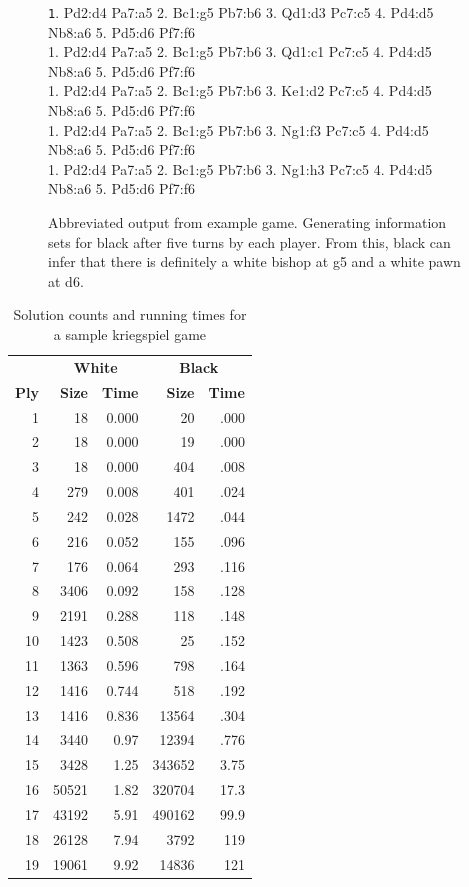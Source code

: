 \documentclass[11pt]{article}
\newenvironment{mytinylisting}
{\begin{list}{}{\setlength{\leftmargin}{1em}}\item\scriptsize\texttt}
{\end{list}}
\begin{document}
\begin{figure}
\begin{mytinylisting}
1. Pd2:d4 Pa7:a5 2. Bc1:g5 Pb7:b6 3. Qd1:d3 Pc7:c5 4. Pd4:d5 Nb8:a6 5. Pd5:d6 Pf7:f6 \\
1. Pd2:d4 Pa7:a5 2. Bc1:g5 Pb7:b6 3. Qd1:c1 Pc7:c5 4. Pd4:d5 Nb8:a6 5. Pd5:d6 Pf7:f6 \\
1. Pd2:d4 Pa7:a5 2. Bc1:g5 Pb7:b6 3. Ke1:d2 Pc7:c5 4. Pd4:d5 Nb8:a6 5. Pd5:d6 Pf7:f6 \\
1. Pd2:d4 Pa7:a5 2. Bc1:g5 Pb7:b6 3. Ng1:f3 Pc7:c5 4. Pd4:d5 Nb8:a6 5. Pd5:d6 Pf7:f6 \\
1. Pd2:d4 Pa7:a5 2. Bc1:g5 Pb7:b6 3. Ng1:h3 Pc7:c5 4. Pd4:d5 Nb8:a6 5. Pd5:d6 Pf7:f6 \\
\end{mytinylisting}
\caption{Abbreviated output from example game.  Generating information sets for black after five turns by each player.
From this, black can infer that there is definitely a white bishop at g5 and a white pawn at d6.}
\label{abbrevoutput}
\end{figure}

\begin{table}
\centering
\begin{tabular}{rrrrr}
 & \multicolumn{2}{c}{\bf White} & \multicolumn{2}{c}{\bf Black} \\
{\bf Ply} & {\bf Size} & {\bf Time} & {\bf Size} & {\bf Time} \\
1 & 18 & 0.000 & 20 & .000 \\
2 & 18 & 0.000 & 19 & .000 \\
3 & 18 & 0.000 & 404 & .008\\
4 & 279 & 0.008 & 401 & .024\\
5 & 242 & 0.028 & 1472 & .044\\
6 & 216 & 0.052 & 155 & .096\\
7 & 176 & 0.064 & 293 & .116\\
8 & 3406 & 0.092 & 158 & .128\\
9 & 2191 & 0.288 & 118 & .148\\
10 & 1423 & 0.508 & 25 & .152\\
11 & 1363 & 0.596 & 798 & .164\\
12 & 1416 & 0.744 & 518 & .192\\
13 & 1416 & 0.836 & 13564 & .304\\
14 & 3440 & 0.97 & 12394 & .776\\
15 & 3428 & 1.25 & 343652 & 3.75\\
16 & 50521 & 1.82 & 320704 & 17.3\\
17 & 43192 & 5.91 & 490162 & 99.9\\
18 & 26128 & 7.94 & 3792 & 119\\
19 & 19061 & 9.92 & 14836 & 121\\
\end{tabular}
\caption{Solution counts and running times for a sample kriegspiel game}
\label{bothtimes}
\end{table}
\end{document}
